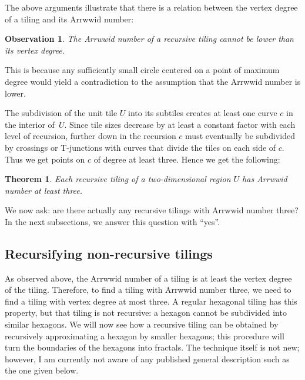 \documentclass[11pt,a4paper]{article}
\newcommand{\unittile}{\ensuremath{U}\xspace}
\newtheorem{theorem}{Theorem}
\newtheorem{observation}{Observation}
\begin{document}
The above arguments illustrate that there is a relation between the vertex degree of a tiling and its Arrwwid number:
\begin{observation}
The Arrwwid number of a recursive tiling cannot be lower than its vertex degree.
\end{observation}
This is because any sufficiently small circle centered on a point of maximum degree would yield a contradiction to the assumption that the Arrwwid number is lower.

The subdivision of the unit tile \unittile into its subtiles creates at least one curve $c$ in the interior of~\unittile. Since tile sizes decrease by at least a constant factor with each level of recursion, further down in the recursion $c$ must eventually be subdivided by crossings or T-junctions with curves that divide the tiles on each side of $c$. Thus we get points on $c$ of degree at least three. Hence we get the following:

\begin{theorem}\label{th:2dtilinglb}
Each recursive tiling of a two-dimensional region \unittile has Arrwwid number at least three.
\end{theorem}

We now ask: are there actually any recursive tilings with Arrwwid number three? In the next subsections, we answer this question with ``yes''.

\subsection{Recursifying non-recursive tilings}
As observed above, the Arrwwid number of a tiling is at least the vertex degree of the tiling. Therefore, to find a tiling with Arrwwid number three, we need to find a tiling with vertex degree at most three. A regular hexagonal tiling has this property, but that tiling is not recursive: a hexagon cannot be subdivided into similar hexagons. We will now see how a recursive tiling can be obtained by recursively approximating a hexagon by smaller hexagons; this procedure will turn the boundaries of the hexagons into fractals. The technique itself is not new; however, I am currently not aware of any published general description such as the one given below.
\end{document}
